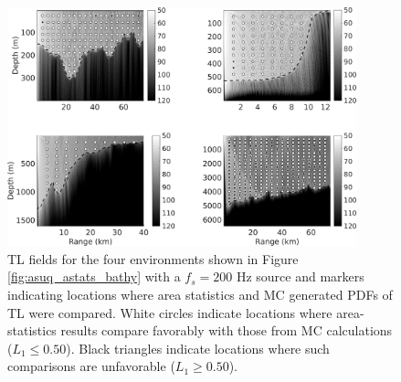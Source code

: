 \begin{figure}[htb]
  \centering
  \includegraphics[width=0.9\textwidth]{./figs/asuq_figs/5}
  \caption[\ac{TL} fields of each environment, with test locations
  shown, indicating where area statistics was and was not
  engineering-level accurate.]{\ac{TL} fields for the four
    environments shown in Figure \ref{fig:asuq_astats_bathy} with a
    $f_s=200$ Hz source and markers indicating locations where area
    statistics and \ac{MC} generated \acp{PDF} of \ac{TL} were
    compared. White circles indicate locations where area-statistics
    results compare favorably with those from \ac{MC} calculations
    ($L_1 \leq 0.50$). Black triangles indicate locations where such
    comparisons are unfavorable ($L_1 \geq 0.50$).}
  \label{fig:asuq_astats_field_results}
\end{figure}



\clearpage
\pagebreak

